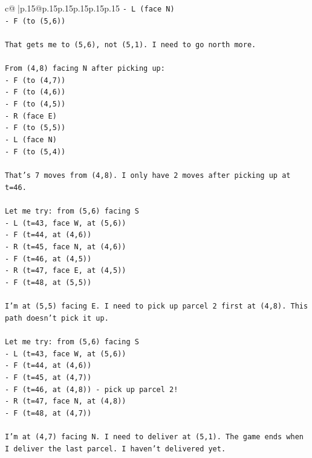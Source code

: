 \documentclass{article}
\begin{document}
{\begin{supertabular}{c@{$\;$}|p{.15\linewidth}@{}p{.15\linewidth}p{.15\linewidth}p{.15\linewidth}p{.15\linewidth}p{.15\linewidth}}
{{{\texttt{{-} L (face N)} \\
\texttt{{-} F (to (5,6))} \\
\\ 
\texttt{That gets me to (5,6), not (5,1). I need to go north more.} \\
\\ 
\texttt{From (4,8) facing N after picking up:} \\
\texttt{{-} F (to (4,7))} \\
\texttt{{-} F (to (4,6))} \\
\texttt{{-} F (to (4,5))} \\
\texttt{{-} R (face E)} \\
\texttt{{-} F (to (5,5))} \\
\texttt{{-} L (face N)} \\
\texttt{{-} F (to (5,4))} \\
\\ 
\texttt{That's 7 moves from (4,8). I only have 2 moves after picking up at t=46.} \\
\\ 
\texttt{Let me try: from (5,6) facing S} \\
\texttt{{-} L (t=43, face W, at (5,6))} \\
\texttt{{-} F (t=44, at (4,6))} \\
\texttt{{-} R (t=45, face N, at (4,6))} \\
\texttt{{-} F (t=46, at (4,5))} \\
\texttt{{-} R (t=47, face E, at (4,5))} \\
\texttt{{-} F (t=48, at (5,5))} \\
\\ 
\texttt{I'm at (5,5) facing E. I need to pick up parcel 2 first at (4,8). This path doesn't pick it up.} \\
\\ 
\texttt{Let me try: from (5,6) facing S} \\
\texttt{{-} L (t=43, face W, at (5,6))} \\
\texttt{{-} F (t=44, at (4,6))} \\
\texttt{{-} F (t=45, at (4,7))} \\
\texttt{{-} F (t=46, at (4,8)) {-} pick up parcel 2!} \\
\texttt{{-} R (t=47, face N, at (4,8))} \\
\texttt{{-} F (t=48, at (4,7))} \\
\\ 
\texttt{I'm at (4,7) facing N. I need to deliver at (5,1). The game ends when I deliver the last parcel. I haven't delivered yet.} \\
}}}
\end{supertabular}}
\end{document}
